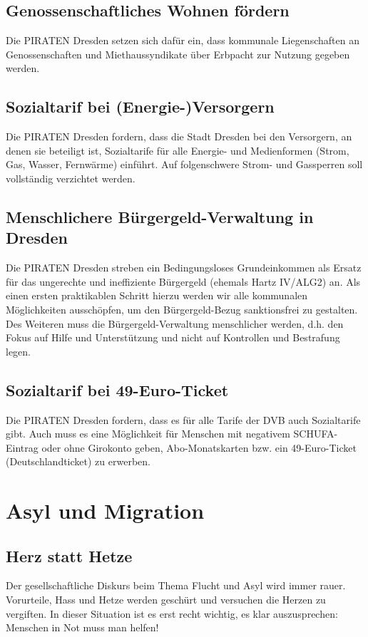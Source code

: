 \documentclass[a4paper, 11pt]{article}
\begin{document}
\subsection{Genossenschaftliches Wohnen fördern}
Die PIRATEN Dresden setzen sich dafür ein, dass kommunale Liegenschaften an Genossenschaften und Miethaussyndikate über Erbpacht zur Nutzung gegeben werden.


\subsection{Sozialtarif bei (Energie-)Versorgern}
Die PIRATEN Dresden fordern, dass die Stadt Dresden bei den Versorgern, an denen sie beteiligt ist, Sozialtarife für alle Energie- und Medienformen (Strom, Gas, Wasser, Fernwärme) einführt. Auf folgenschwere Strom- und Gassperren soll vollständig verzichtet werden.




\subsection{Menschlichere Bürgergeld-Verwaltung in Dresden}
Die PIRATEN Dresden streben ein Bedingungsloses Grundeinkommen als Ersatz für das ungerechte und ineffiziente Bürgergeld (ehemals Hartz IV/ALG2) an. Als einen ersten praktikablen Schritt hierzu werden wir alle kommunalen Möglichkeiten ausschöpfen, um den Bürgergeld-Bezug sanktionsfrei zu gestalten. Des Weiteren muss die Bürgergeld-Verwaltung menschlicher werden, d.h. den Fokus auf Hilfe und Unterstützung und nicht auf Kontrollen und Bestrafung legen.


\subsection{Sozialtarif bei 49-Euro-Ticket}
Die PIRATEN Dresden fordern, dass es für alle Tarife der DVB auch Sozialtarife gibt. Auch muss es eine Möglichkeit für Menschen mit negativem SCHUFA-Eintrag oder ohne Girokonto geben, Abo-Monatskarten bzw. ein 49-Euro-Ticket (Deutschlandticket) zu erwerben.


\section{Asyl und Migration}

\subsection{Herz statt Hetze}
Der gesellschaftliche Diskurs beim Thema Flucht und Asyl wird immer rauer. Vorurteile, Hass und Hetze werden geschürt und versuchen die Herzen zu vergiften. In dieser Situation ist es erst recht wichtig, es klar auszusprechen: Menschen in Not muss man helfen!\newline
\end{document}

